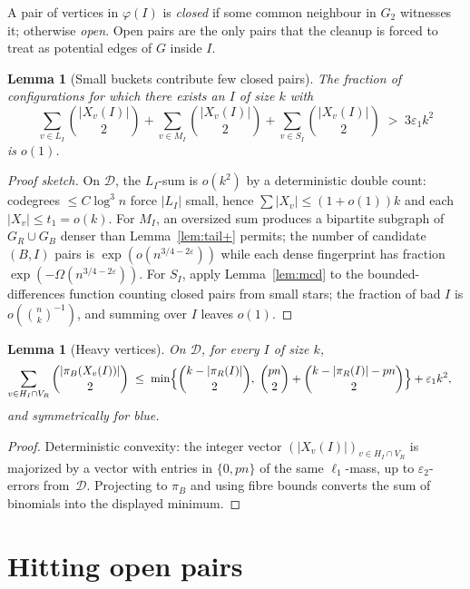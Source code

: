 \documentclass[11pt]{article}
\newtheorem{lemma}[theorem]{Lemma}
\theoremstyle{definition}
\newcommand{\bin}[2]{\binom{#1}{#2}}
\newcommand{\cD}{\mathcal{D}}
\newcommand{\eps}{\varepsilon}
\begin{document}
A pair of vertices in $\varphi(I)$ is \emph{closed} if some common neighbour in $G_{2}$ witnesses it; otherwise \emph{open}.
Open pairs are the only pairs that the cleanup is forced to treat as potential edges of $G$ inside $I$.

\begin{lemma}[Small buckets contribute few closed pairs]\label{lem:buckets}
The fraction of configurations for which there exists an $I$ of size $k$ with
\[
  \sum_{v\in L_{I}}\bin{|X_{v}(I)|}{2}
  +
  \sum_{v\in M_{I}}\bin{|X_{v}(I)|}{2}
  +
  \sum_{v\in S_{I}}\bin{|X_{v}(I)|}{2}
  \;>\;
  3\eps_{1}k^{2}
\]
is $o(1)$.
\end{lemma}

\begin{proof}[Proof sketch]
On $\cD$, the $L_{I}$-sum is $o(k^{2})$ by a deterministic double count: codegrees $\le C\log^{3}n$ force $|L_{I}|$ small, hence $\sum|X_{v}|\le(1+o(1))k$ and each $|X_{v}|\le t_{1}=o(k)$.
For $M_{I}$, an oversized sum produces a bipartite subgraph of $G_{R}\cup G_{B}$ denser than Lemma~\ref{lem:tail+} permits; the number of candidate $(B,I)$ pairs is $\exp(o(n^{3/4-2\eps}))$ while each dense fingerprint has fraction $\exp(-\Omega(n^{3/4-2\eps}))$.
For $S_{I}$, apply Lemma~\ref{lem:mcd} to the bounded-differences function counting closed pairs from small stars; the fraction of bad $I$ is $o(\bin{n}{k}^{-1})$, and summing over $I$ leaves $o(1)$.
\end{proof}

\begin{lemma}[Heavy vertices]\label{lem:heavy}
On $\cD$, for every $I$ of size $k$,
\begin{align*}
  \sum_{v\in H_{I}\cap V_{R}}\bin{|\pi_{B}(X_{v}(I))|}{2}
  &\;\le\;
  \min\Bigl\{\bin{k-|\pi_{R}(I)|}{2},\;
  \bin{pn}{2}+\bin{k-|\pi_{R}(I)|-pn}{2}\Bigr\}+\eps_{1}k^{2},
\end{align*}
and symmetrically for blue.
\end{lemma}

\begin{proof}
Deterministic convexity: the integer vector $(|X_{v}(I)|)_{v\in H_{I}\cap V_{R}}$ is majorized by a vector with entries in $\{0,pn\}$ of the same $\ell_{1}$-mass, up to $\eps_{2}$-errors from~$\cD$.
Projecting to $\pi_{B}$ and using fibre bounds converts the sum of binomials into the displayed minimum.
\end{proof}

\section{Hitting open pairs}
\end{document}
